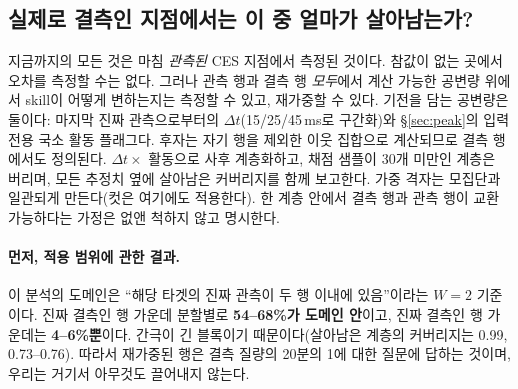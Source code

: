 \documentclass[10pt,a4paper]{article}
\begin{document}
\subsection{실제로 결측인 지점에서는 이 중 얼마가 살아남는가?}
\label{sec:mnar}

지금까지의 모든 것은 마침 \emph{관측된} CES 지점에서 측정된 것이다. 참값이 없는
곳에서 오차를 측정할 수는 없다. 그러나 관측 행과 결측 행 \emph{모두}에서 계산
가능한 공변량 위에서 skill이 어떻게 변하는지는 측정할 수 있고, 재가중할 수 있다.
기전을 담는 공변량은 둘이다: 마지막 진짜 관측으로부터의 $\Delta t$(15/25/45\,ms로
구간화)와 \S\ref{sec:peak}의 입력 전용 국소 활동 플래그다. 후자는 자기 행을
제외한 이웃 집합으로 계산되므로 결측 행에서도 정의된다. $\Delta t \times$ 활동으로
사후 계층화하고, 채점 샘플이 30개 미만인 계층은 버리며, 모든 추정치 옆에 살아남은
커버리지를 함께 보고한다. 가중 격자는 모집단과 일관되게 만든다(컷은 여기에도
적용한다). 한 계층 안에서 결측 행과 관측 행이 교환 가능하다는 가정은 없앤 척하지
않고 명시한다.

\paragraph{먼저, 적용 범위에 관한 결과.} 이 분석의 도메인은 ``해당 타겟의 진짜
관측이 두 행 이내에 있음''이라는 $W{=}2$ 기준이다. 진짜 결측인 \Ti{} 행 가운데
분할별로 \textbf{54--68\%가 도메인 안}이고, 진짜 결측인 \Vrot{} 행 가운데는
\textbf{4--6\%뿐}이다. \Vrot{} 간극이 긴 블록이기 때문이다(살아남은 계층의
커버리지는 \Ti{} 0.99, \Vrot{} 0.73--0.76). 따라서 재가중된 \Vrot{} 행은 결측
질량의 20분의 1에 대한 질문에 답하는 것이며, 우리는 거기서 아무것도 끌어내지
않는다.
\end{document}
